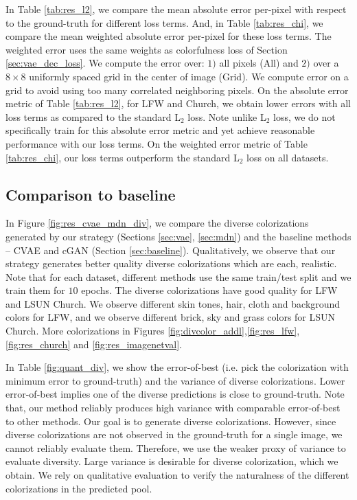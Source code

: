 \documentclass[10pt,twocolumn,letterpaper]{article}
\begin{document}
In Table \ref{tab:res_l2}, we compare the mean absolute error per-pixel with respect to 
the ground-truth for different loss terms. And, in Table \ref{tab:res_chi},
we compare the mean weighted absolute error per-pixel for these
loss terms. The weighted error uses the same weights as colorfulness loss of 
Section \ref{sec:vae_dec_loss}. We compute the error over: $1)$ all pixels 
(All) and $2)$ over a $8 \times 8$ uniformly spaced grid in the center of 
image (Grid). We compute error on a grid to avoid using too many correlated 
neighboring pixels. On the absolute error metric of Table \ref{tab:res_l2}, 
for LFW and Church, we obtain lower errors with all loss terms as compared to the 
standard L$_2$ loss. Note unlike L$_2$ loss, we do not specifically train for 
this absolute error metric and yet achieve reasonable performance with our 
loss terms. On the weighted error metric of Table \ref{tab:res_chi}, our loss 
terms outperform the standard L$_2$ loss on all datasets.

\subsection{Comparison to baseline}\label{sec:res_div}

In Figure \ref{fig:res_cvae_mdn_div}, we compare the diverse colorizations generated
by our strategy (Sections \ref{sec:vae}, \ref{sec:mdn}) and the baseline 
methods -- CVAE and cGAN (Section \ref{sec:baseline}). Qualitatively, we observe that our 
strategy generates better quality diverse colorizations which are each, realistic.
Note that for each dataset, different methods use the same train/test split and 
we train them for $10$ epochs. The diverse colorizations have good quality for
LFW and LSUN Church. We observe different skin tones, hair, cloth and background colors 
for LFW, and we observe different brick, sky and grass colors for LSUN Church.
More colorizations in Figures \ref{fig:divcolor_addl},\ref{fig:res_lfw},\ref{fig:res_church} and \ref{fig:res_imagenetval}.

In Table \ref{fig:quant_div}, we show the error-of-best (i.e. pick the
colorization with minimum error to ground-truth) and the variance of
diverse colorizations. Lower error-of-best implies one of
the diverse predictions is close to ground-truth. Note that, our method reliably produces 
high variance with comparable error-of-best to other methods. Our goal is to generate diverse 
colorizations. However, since diverse colorizations are not observed in the ground-truth
for a single image, we cannot reliably evaluate them. Therefore, we use the weaker 
proxy of variance to evaluate diversity. Large variance is desirable for diverse 
colorization, which we obtain. We rely on qualitative evaluation to verify the 
naturalness of the different colorizations in the predicted pool.
\end{document}
